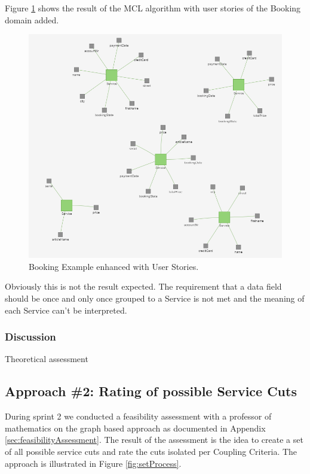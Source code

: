 Figure \ref{fig:clusteringBooking} shows the result of the MCL algorithm with user stories of the Booking domain added. 

\begin{figure}[H]
	\begin{center}
		\includegraphics[scale=0.7]{images/booking_entities_mcl.png}
	\end{center}
	\caption{Booking Example enhanced with User Stories.}
	\label{fig:clusteringBooking}
\end{figure}

Obviously this is not the result expected. The requirement that a data field should be once and only once grouped to a Service is not met and the meaning of each Service can't be interpreted. 


\subsubsection{Discussion}
Theoretical assessment


\subsection{Approach \#2: Rating of possible Service Cuts}

During sprint 2 we conducted a feasibility assessment with a professor of mathematics on the graph based approach as documented in Appendix \ref{sec:feasibilityAssessment}. The result of the assessment is the idea to create a set of all possible service cuts and rate the cuts isolated per Coupling Criteria. The approach is illustrated in Figure \ref{fig:setProcess}.

